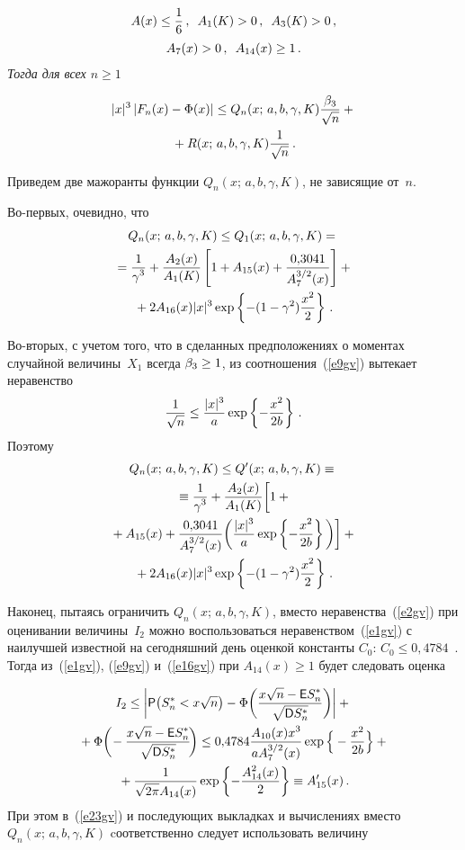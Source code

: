 \begin{multicols}{2}
\noindent
\begin{multline*}
A(x)\le\fr{1}{6}\,, \enskip A_1(K)>0\,,\enskip  A_3(K)>0\,,\\
 A_7(x)>0\,,\enskip 
A_{14}(x)\ge1\,.
\end{multline*}
\textit{Тогда для всех $n\ge1$}

\noindent
\begin{multline*}
|x|^{\dd}\left|F_n(x)-\Phi(x)\right|
\le
Q_n(x;\,a,b,\gamma,K)\Lo+{}\\
{}+R(x;\,a,b,\gamma,K)\frac{1}{\sqrt{n}}\,.
\end{multline*}

\smallskip

Приведем две мажоранты функции $Q_n(x;\,a,b,\gamma,K)$,
не зависящие от~$n$.

Во-первых, очевидно, что
\begin{multline}
Q_n(x;\,a,b,\gamma,K)\le Q_1(x;\,a,b,\gamma,K)={}\\
{}
=\fr{1}{\gamma^{\dd}}+\fr{A_2(x)}{A_1(K)}\left[1+A_{15}(x)+
\fr{0{,}3041}{A_7^{3/2}(x)}\right]+{}\\
{}+2A_{16}(x)|x|^{\dd}\exp\left\{-(1-\gamma^2)\fr{x^2}{2}\right\}\,.\label{e24gv}
\end{multline}


Во-вторых, с учетом того, что в сделанных предположениях о
моментах случайной величины~$X_1$ всегда $\betr\ge1$, из
соотношения~(\ref{e9gv}) вытекает неравенство
$$
\fr{1}{\sqrt{n}}\le\fr{|x|^{\dd}}{a}\exp\left\{-\fr{x^2}{2b}\right\}\,.
$$
Поэтому
\begin{multline}
Q_n(x;\,a,b,\gamma,K)\le Q'(x;\,a,b,\gamma,K)\equiv{}\\
{}\equiv
\fr{1}{\gamma^{\dd}}+\fr{A_2(x)}{A_1(K)}\bigg[1+{}\\
{}+A_{15}(x)+
\fr{0{,}3041}{A_7^{3/2}(x)}\bigg(\fr{|x|^{\dd}}{a}\exp\left\{-\fr{x^2}{2b}\right\}\bigg)\bigg]
+{}\\
{}+
2A_{16}(x)|x|^{\dd}\exp\left\{-(1-\gamma^2)\fr{x^2}{2}\right\}\,.\label{e25gv}
\end{multline}

Наконец, пытаясь ограничить $Q_n(x;\,a,b,\gamma,K)$, вместо
неравенства~(\ref{e2gv}) при оценивании величины~$I_2$ можно
воспользоваться неравенством~(\ref{e1gv}) с наилучшей известной на
сегодняшний день оценкой константы $C_0$: $C_0 \le 0{,}4784$~\cite{KorolevBEs}. 
Тогда из~(\ref{e1gv}), (\ref{e9gv}) и~(\ref{e16gv}) при $A_{14}(x)\ge1$
будет следовать оценка

\noindent
\begin{multline*}
I_2\le\bigg|{\sf
P}\big(S_n^*<x\sqrt{n}\big)-\Phi\bigg(\fr{x\sqrt{n}-{\sf
E}S_n^*}{\sqrt{{\sf
D}S_n^*}}\bigg)\bigg|+{}\\
{}+\Phi\bigg(\!-\fr{x\sqrt{n}-{\sf
E}S_n^*}{\sqrt{{\sf D}S_n^*}}\!\bigg)\le
0{,}4784\fr{A_{10}(x)x^{\dd}}{aA_7^{3/2}(x)}\exp\Big\{-\frac{x^2}{2b}\Big\}+{}\\
{}+
\fr{1}{\sqrt{2\pi}A_{14}(x)}\exp\left\{-\fr{A_{14}^2(x)}{2}\right\}\equiv
A'_{15}(x)\,.
\end{multline*}
При этом в~(\ref{e23gv}) и последующих выкладках и вычислениях вместо
$Q_n(x;\,a,b,\gamma,K)$ cоответственно следует использовать
величину


\end{multicols}

